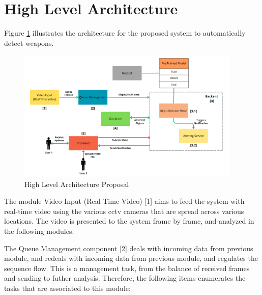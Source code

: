 \section{High Level Architecture}
Figure \ref{fig:architecture-proposal} illustrates the architecture for the proposed system to 
automatically detect weapons. 

\begin{figure}[ht]
    \centering 
    \includegraphics[width=0.95\textwidth]{figs/high-level.png} 
    \caption{High Level Architecture Proposal}
    \label{fig:architecture-proposal}
\end{figure}


The module Video Input (Real-Time Video) [1] aims to feed the system with real-time video using the various \ac{cctv} 
cameras that are spread across various locations.  The video is presented to the system frame by frame, and analyzed 
in the following modules.

The Queue Management component [2] deals with incoming data from previous module, and redeals with incoming data 
from previous module, and regulates the sequence flow. This is a management task, from the balance of received frames 
and sending to futher analysis. Therefore, the following items enumerates the tasks that are associated to this module:

